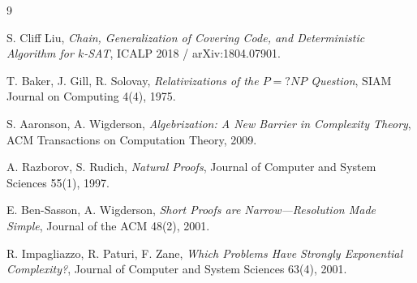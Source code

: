 \documentclass[11pt]{article}
\theoremstyle{plain}
\theoremstyle{definition}
\theoremstyle{remark}
\begin{document}
\begin{thebibliography}{9}

S. Cliff Liu,
\emph{Chain, Generalization of Covering Code, and Deterministic Algorithm for $k$-SAT},
ICALP 2018 / arXiv:1804.07901.

T. Baker, J. Gill, R. Solovay,
\emph{Relativizations of the $P=?NP$ Question},
SIAM Journal on Computing 4(4), 1975.

S. Aaronson, A. Wigderson,
\emph{Algebrization: A New Barrier in Complexity Theory},
ACM Transactions on Computation Theory, 2009.

A. Razborov, S. Rudich,
\emph{Natural Proofs},
Journal of Computer and System Sciences 55(1), 1997.

E. Ben-Sasson, A. Wigderson,
\emph{Short Proofs are Narrow---Resolution Made Simple},
Journal of the ACM 48(2), 2001.

R. Impagliazzo, R. Paturi, F. Zane,
\emph{Which Problems Have Strongly Exponential Complexity?},
Journal of Computer and System Sciences 63(4), 2001.

\end{thebibliography}
\end{document}

